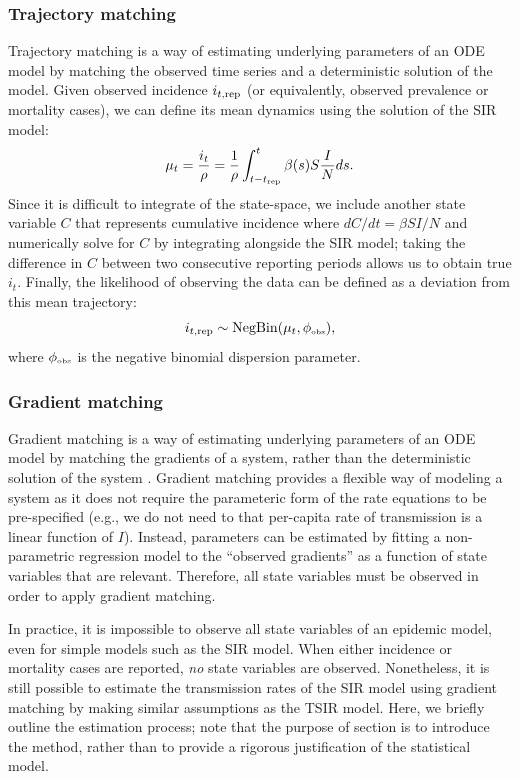 \documentclass{article}
\newcommand{\tsub}[2]{#1_{{\textrm{\tiny #2}}}}
\begin{document}
\subsubsection*{Trajectory matching}

Trajectory matching is a way of estimating underlying parameters of an ODE model by matching the observed time series and a deterministic solution of the model.
Given observed incidence $i_{t, {\tiny \textrm{rep}}}$ (or equivalently, observed prevalence or mortality cases), we can define its mean dynamics using the solution of the SIR model:
\begin{equation}
\mu_t = \frac{i_t}{\rho} = \frac{1}{\rho} \int_{t-\tsub{t}{rep}}^{t} \beta(s) S \frac{I}{N} ds.
\end{equation}
Since it is difficult to integrate of the state-space, we include another state variable $C$ that represents cumulative incidence where $dC/dt = \beta SI/N$ and numerically solve for $C$ by integrating alongside the SIR model; taking the difference in $C$ between two consecutive reporting periods allows us to obtain true $i_t$.
Finally, the likelihood of observing the data can be defined as a deviation from this mean trajectory:
\begin{equation}
i_{t, {\tiny \textrm{rep}}} \sim \mathrm{NegBin}(\mu_t, \tsub{\phi}{obs}),
\end{equation}
where $\tsub{\phi}{obs}$ is the negative binomial dispersion parameter.

\subsubsection*{Gradient matching}

Gradient matching is a way of estimating underlying parameters of an ODE model by matching the gradients of a system, rather than the deterministic solution of the system \citep{ellner2002fitting}.
Gradient matching provides a flexible way of modeling a system as it does not require the parameteric form of the rate equations to be pre-specified (e.g., we do not need to that per-capita rate of transmission is a linear function of $I$).
Instead, parameters can be estimated by fitting a non-parametric regression model to the ``observed gradients'' as a function of state variables that are relevant.
Therefore, all state variables must be observed in order to apply gradient matching.

In practice, it is impossible to observe all state variables of an epidemic model, even for simple models such as the SIR model.
When either incidence or mortality cases are reported, \emph{no} state variables are observed.
Nonetheless, it is still possible to estimate the transmission rates of the SIR model using gradient matching by making similar assumptions as the TSIR model.
Here, we briefly outline the estimation process; note that the purpose of section is to introduce the method, rather than to provide a rigorous justification of the statistical model.
\end{document}
